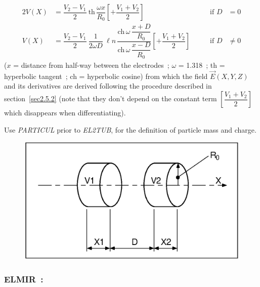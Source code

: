  \begin{alignat*}{2}
	 V(X) &   = \dfrac{ V_2-V_1}{2} \: \text{th}\,
	            \dfrac{\omega x }{ R_0} 
	             \left[+ \dfrac{V_1+V_2 }{ 2} \right] 
	      & \qquad \text{if }  D & =0\\
	V(X) &  =  \dfrac{ V_2-V_1 }{ 2}\: \dfrac{1}{ 2\omega D} \: \ell n\,
	           \dfrac{\text{ch}\, \omega\,    \dfrac{x+D }{ R_0} }%
	           {\text{ch} \,\omega \,\dfrac{x-D }{ R_0}}
	           \left[+ \dfrac{V_1+V_2 }{ 2} \right]
	            & \qquad \text{if }  D &  \not= 0 
 \end{alignat*}
%
($ x $ = distance from half-way between the electrodes~;
$\omega$  =  1.318~; th =  hyperbolic tangent~; ch  =  hyperbolic cosine)
from which the field $ \vec  E(X,Y,Z) $ and its derivatives are derived following the 
procedure described in section~\ref{sec2.5.2}  (note that they don't 
depend on the constant term $ \left[\dfrac{V_1+V_2 }{ 2} \right] $ which
disappears when differentiating). 

\noindent Use \textsl{PARTICUL} prior to \textsl{EL2TUB}, for the
 definition of  particle mass and charge.

\vfill

\begin{figure}[H]
\centerline{\includegraphics[width=14cm]{Fig22.ps}}
\caption{\CapELtwoTUB \label{fig22}}
\end{figure}

\vfill

\newpage

\subsubsection*{ELMIR~: \ELMIRTitl }\label{ELMIR}
\medskip


